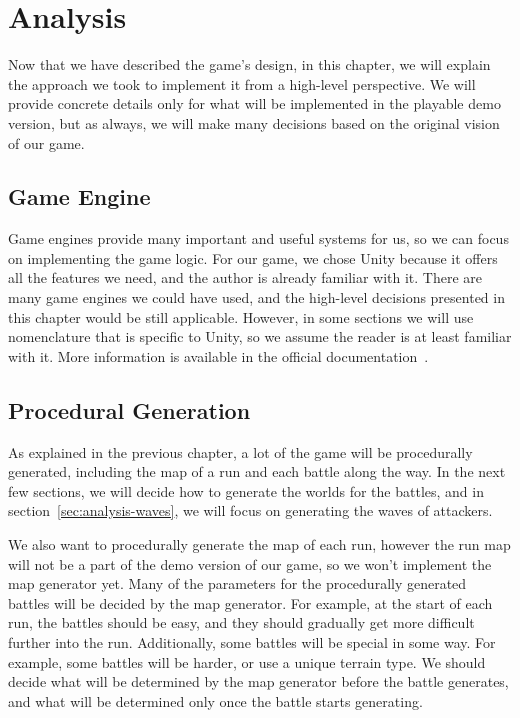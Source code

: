 \chapter{Analysis}\label{analysis}

Now that we have described the game's design, in this chapter, we will explain the approach we took to implement it from a high-level perspective.
We will provide concrete details only for what will be implemented in the playable demo version, but as always, we will make many decisions based on the original vision of our game.

\section{Game Engine}

Game engines provide many important and useful systems for us, so we can focus on implementing the game logic.
For our game, we chose Unity because it offers all the features we need, and the author is already familiar with it.
There are many game engines we could have used, and the high-level decisions presented in this chapter would be still applicable.
However, in some sections we will use nomenclature that is specific to Unity, so we assume the reader is at least familiar with it.
More information is available in the official documentation~\cite{UnityDocs}.

\section{Procedural Generation}\label{sec:analysis-procedural-generation}

As explained in the previous chapter, a lot of the game will be procedurally generated, including the map of a run and each battle along the way.
In the next few sections, we will decide how to generate the worlds for the battles, and in section~\ref{sec:analysis-waves}, we will focus on generating the waves of attackers.

We also want to procedurally generate the map of each run, however the run map will not be a part of the demo version of our game, so we won't implement the map generator yet.
Many of the parameters for the procedurally generated battles will be decided by the map generator.
For example, at the start of each run, the battles should be easy, and they should gradually get more difficult further into the run.
Additionally, some battles will be special in some way.
For example, some battles will be harder, or use a unique terrain type.
We should decide what will be determined by the map generator before the battle generates, and what will be determined only once the battle starts generating.

